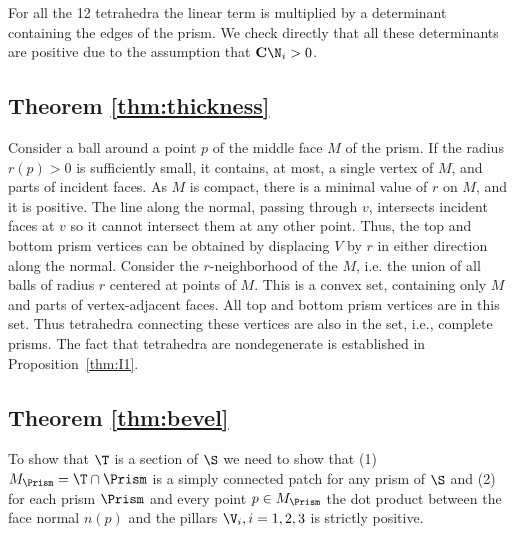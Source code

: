 For all the 12 tetrahedra the linear term is multiplied by a determinant containing the edges of the prism. We check directly that all these determinants are positive due to the assumption that $\mathbf{C} \N_i > 0$.

\subsection{Theorem \ref{thm:thickness}}
\label{app:thickness}

Consider a ball around a point $p$ of the middle face $M$ of the prism.  
If the radius $r(p) > 0$ is sufficiently small, it contains, at most, a single vertex of $M$, and parts of incident  faces. As $M$ is compact, there is a minimal value of $r$ on $M$, and it is positive. 
The line along the normal, passing through $v$, intersects incident faces at $v$ so it cannot intersect them at any other point. Thus, the top and bottom prism vertices can be obtained by displacing $V$ by $r$ in either direction along the normal. 
Consider the $r$-neighborhood of the $M$, i.e. the union of all balls of radius $r$ centered at 
points of $M$. This is a convex set, containing only $M$ and parts of vertex-adjacent faces. 
All top and bottom prism vertices are in this set. Thus tetrahedra connecting these vertices are also in the set, i.e., complete prisms. The fact that tetrahedra are nondegenerate is established in Proposition~\ref{thm:I1}.

\subsection{Theorem \ref{thm:bevel}}
\label{app:bevel}
To show that $\T$ is a section of $\S$ we need to show that (1) $M_\Prism= \T \cap \Prism$ is a simply connected patch  for any prism of $\S$
and (2) for {each prism $\Prism$} and every point $p\in M_\Prism$ the dot product between the face normal $n(p)$ and the {pillars} $\V_i, i=1,2,3$ is strictly {positive}.

